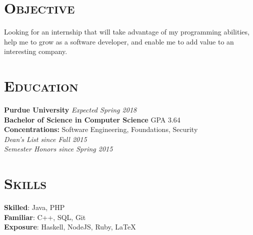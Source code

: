
\hypersetup{backref,pdfpagemode=Full,colorlinks=true,backref}

\addtolength{\oddsidemargin}{-0.45in}
\addtolength{\voffset}{-0.20in}
\addtolength{\textwidth}{0.85in}
\addtolength{\textheight}{1.00in}

\renewcommand{\namefont}{\LARGE\emph}




\address{ryndvs96@gmail.com \ \ \ \ \ github.com/ryndvs96}
\begin{resume}


\section{\textsc{Objective}}

Looking for an internship that will take advantage of my programming abilities, help me to grow as a software developer, and enable me to add value to an interesting company.


\section{\textsc{Education}}

\textbf{Purdue University} \hfill \emph{Expected Spring 2018} \\
\textbf{Bachelor of Science in Computer Science} \hfill GPA 3.64\\
\textbf{Concentrations:} Software Engineering, Foundations, Security\\
\emph{Dean's List since Fall 2015}\\
\emph{Semester Honors since Spring 2015}



\section{\textsc{Skills}}

\small{\textbf{Skilled}: }\normalsize{Java, PHP}\\
\small{\textbf{Familiar}: }\normalsize{C++, SQL, Git}\\
\small{\textbf{Exposure}: }\normalsize{Haskell, NodeJS, Ruby, \LaTeX}


\end{resume}
